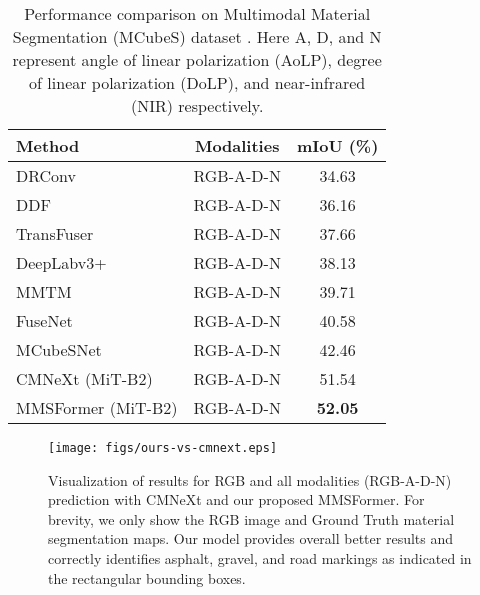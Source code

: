\documentclass{article}
\begin{document}
\begin{table}[th]
\centering
\caption{Performance comparison on Multimodal Material Segmentation (MCubeS) dataset \cite{Liang2022MCubeS}. Here A, D, and N represent angle of linear polarization (AoLP), degree of linear polarization (DoLP), and near-infrared (NIR) respectively.}
\label{tab:performance-comparison}
\begin{tabular}{lcc}
    \toprule
    Method                                 & Modalities & mIoU (\%) \\
    \midrule
    \midrule
    DRConv  \cite{chen2021DRConv}            & RGB-A-D-N  & 34.63 \\
    DDF  \cite{zhou2021DDF}                  & RGB-A-D-N  & 36.16 \\
    TransFuser  \cite{prakash2021TransFuser} & RGB-A-D-N  & 37.66 \\
    DeepLabv3+  \cite{chen2018deeplabv3+}    & RGB-A-D-N  & 38.13 \\
    MMTM  \cite{joze2020mmtm}                & RGB-A-D-N  & 39.71 \\
    FuseNet  \cite{hazirbas2017fusenet}      & RGB-A-D-N  & 40.58 \\
    MCubeSNet  \cite{Liang2022MCubeS}        & RGB-A-D-N  & 42.46 \\
    CMNeXt (MiT-B2)  \cite{zhang2023CMNext}  & RGB-A-D-N  & 51.54 \\  
    MMSFormer (MiT-B2)                     & RGB-A-D-N  & \textbf{52.05} \\
    \bottomrule
\end{tabular}
\end{table} 
\begin{figure*}[th]
     \centering
     \texttt{[image: figs/ours-vs-cmnext.eps]}
    \caption{Visualization of results for RGB and all modalities (RGB-A-D-N) prediction with CMNeXt \cite{zhang2023CMNext} and our proposed MMSFormer. For brevity, we only show the RGB image and Ground Truth material segmentation maps. Our model provides overall better results and correctly  identifies asphalt, gravel, and road markings as indicated in the rectangular bounding boxes.}
    \label{fig:ours-vs-cmnext}
\end{figure*}
\end{document}
